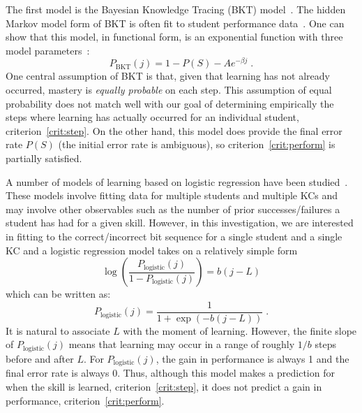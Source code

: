 \documentclass{edm_template}
\begin{document}
The first model is the Bayesian Knowledge Tracing (BKT) 
model~\cite{corbett_knowledge_1995}.  The hidden Markov model
form of BKT is often fit to student performance 
data~\cite{beck_identifiability:_2007}.  One can show that
this model, in functional form, is an exponential function
with three model parameters~\cite{van_de_sande_properties_2012}:
%
\begin{equation}
         P_\mathrm{BKT}(j) = 1-P(S) -A e^{-\beta j} \; .
\end{equation}
%
One central assumption of BKT is that, given that learning
has not already occurred, mastery is {\em equally probable} on each step.
This assumption of equal probability does not match well with 
our goal of determining empirically the steps where learning has 
actually occurred for an individual student, criterion~\ref{crit:step}.
On the other hand, this model does provide the final
error rate $P(S)$ (the initial error rate is ambiguous), 
so criterion~\ref{crit:perform} is partially satisfied. 

A number of models of learning based on 
logistic regression have been studied~\cite{cen_learning_2006,%
pavlik_performance_2009,chi_instructional_2011}.  
These models involve fitting data for 
multiple students and multiple KCs and may involve other observables
such as the number of prior successes/failures a student has had for 
a given skill.  However, in this investigation, we are interested in fitting
to the correct/incorrect bit sequence for a single student 
and a single KC and a logistic regression model takes on a
relatively simple form 
%
\begin{equation}
    \log\left(\frac{P_\mathrm{logistic}(j)}{1-P_\mathrm{logistic}(j)}\right)= 
                 b (j-L) 
\end{equation}
which can be written as:
\begin{equation}
    P_\mathrm{logistic}(j)= \frac{1}{1+\exp\left(-b (j-L)\right)} \; .
\end{equation}
%
It is natural to associate $L$ with the moment of learning.  However,
the finite slope of $P_\mathrm{logistic}(j)$ means that learning may
occur in a range of roughly $1/b$ steps before and after $L$.  For
$P_\mathrm{logistic}(j)$, the gain in performance is always 1 and the
final error rate is always 0.  Thus, although this model makes a
prediction for when the skill is learned, criterion~\ref{crit:step},
it does not predict a gain in performance,
criterion~\ref{crit:perform}.
\end{document}
